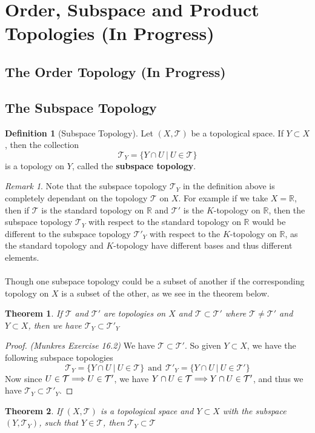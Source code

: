 \documentclass{article}
\newtheorem{theorem}{Theorem}[section]
\theoremstyle{remark}
\newtheorem*{remark}{Remark}
\theoremstyle{definition}
\newtheorem{definition}{Definition}[section]
\newcommand{\simplies}{\DOTSB\Longrightarrow}
\begin{document}
\newpage

\section{Order, Subspace and Product Topologies (In Progress)}

\bigskip

\subsection{The Order Topology (In Progress)}
\bigskip
\subsection{The Subspace Topology}
\begin{definition}[Subspace Topology]
Let $(X, \mathcal{T})$ be a topological space. If $Y \subset X$, then the collection $$\mathcal{T}_Y = \{ Y \cap U \ | \  U \in \mathcal{T}\}$$ is a topology on $Y$, called the \textbf{subspace topology}.
\end{definition}
\medskip
\begin{remark}
Note that the subspace topology $\mathcal{T}_Y$ in the definition above is completely dependant on the topology $\mathcal{T}$ on $X$. For example if we take $X = \mathbb{R}$, then if $\mathcal{T}$ is the standard topology on $\mathbb{R}$ and $\mathcal{T'}$ is the $K$-topology on $\mathbb{R}$, then the subspace topology $\mathcal{T}_Y$ with respect to the standard topology on $\mathbb{R}$ would be different to the subspace topology $\mathcal{T'}_Y$ with respect to the $K$-topology on $\mathbb{R}$, as the standard topology and $K$-topology have different bases and thus different elements. \\ \\Though one subspace topology could be a subset of another if the corresponding topology on $X$ is a subset of the other, as we see in the theorem below.
\end{remark}
\medskip
\begin{theorem}
If $\mathcal{T}$ and $\mathcal{T'}$ are topologies on $X$ and $\mathcal{T} \subset \mathcal{T'}$ where $\mathcal{T} \neq \mathcal{T'}$ and $Y \subset X$, then we have $\mathcal{T}_Y \subset \mathcal{T'}_Y$
\end{theorem}

\begin{proof}
\textit{(Munkres Exercise 16.2)} We have $\mathcal{T} \subset \mathcal{T'}$. So given $Y \subset X$, we have the following subspace topologies $$\mathcal{T}_Y = \{Y \cap U \ | \ U \in \mathcal{T}\} \ \ \text{and} \ \ \mathcal{T'}_Y = \{ Y \cap U \ | \ U \in \mathcal{T'}\}$$
Now since $U \in \mathcal{T} \simplies U \in \mathcal{T'}$, we have $Y \cap U \in \mathcal{T} \simplies Y \cap U \in \mathcal{T'}$, and thus we have $\mathcal{T}_Y \subset \mathcal{T'}_Y$.
\end{proof}
\medskip
\begin{theorem}
If $(X, \mathcal{T})$ is a topological space and $Y \subset X$ with the subspace $(Y, \mathcal{T}_Y)$, such that $Y \in \mathcal{T}$, then $ \mathcal{T}_Y \subset \mathcal{T}$
\end{theorem}
\end{document}
